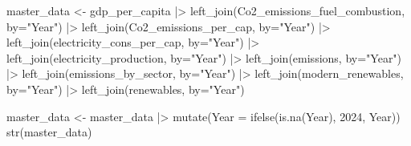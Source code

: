 \documentclass[
  letterpaper,
  DIV=11,
  numbers=noendperiod]{scrartcl}
\newenvironment{Shaded}{\begin{snugshade}}{\end{snugshade}}
\newcommand{\AttributeTok}[1]{\textcolor[rgb]{0.40,0.45,0.13}{#1}}
\newcommand{\DecValTok}[1]{\textcolor[rgb]{0.68,0.00,0.00}{#1}}
\newcommand{\FunctionTok}[1]{\textcolor[rgb]{0.28,0.35,0.67}{#1}}
\newcommand{\NormalTok}[1]{\textcolor[rgb]{0.00,0.23,0.31}{#1}}
\newcommand{\OtherTok}[1]{\textcolor[rgb]{0.00,0.23,0.31}{#1}}
\newcommand{\SpecialCharTok}[1]{\textcolor[rgb]{0.37,0.37,0.37}{#1}}
\newcommand{\StringTok}[1]{\textcolor[rgb]{0.13,0.47,0.30}{#1}}
\begin{document}
\begin{Shaded}
\begin{Highlighting}[]
\NormalTok{master\_data }\OtherTok{\textless{}{-}}\NormalTok{ gdp\_per\_capita }\SpecialCharTok{|\textgreater{}}
  \FunctionTok{left\_join}\NormalTok{(Co2\_emissions\_fuel\_combustion, }\AttributeTok{by=}\StringTok{"Year"}\NormalTok{) }\SpecialCharTok{|\textgreater{}}
  \FunctionTok{left\_join}\NormalTok{(Co2\_emissions\_per\_cap, }\AttributeTok{by=}\StringTok{"Year"}\NormalTok{) }\SpecialCharTok{|\textgreater{}}
  \FunctionTok{left\_join}\NormalTok{(electricity\_cons\_per\_cap, }\AttributeTok{by=}\StringTok{"Year"}\NormalTok{) }\SpecialCharTok{|\textgreater{}}
  \FunctionTok{left\_join}\NormalTok{(electricity\_production, }\AttributeTok{by=}\StringTok{"Year"}\NormalTok{) }\SpecialCharTok{|\textgreater{}}
  \FunctionTok{left\_join}\NormalTok{(emissions, }\AttributeTok{by=}\StringTok{"Year"}\NormalTok{) }\SpecialCharTok{|\textgreater{}}
  \FunctionTok{left\_join}\NormalTok{(emissions\_by\_sector, }\AttributeTok{by=}\StringTok{"Year"}\NormalTok{) }\SpecialCharTok{|\textgreater{}}
  \FunctionTok{left\_join}\NormalTok{(modern\_renewables, }\AttributeTok{by=}\StringTok{"Year"}\NormalTok{) }\SpecialCharTok{|\textgreater{}}
  \FunctionTok{left\_join}\NormalTok{(renewables, }\AttributeTok{by=}\StringTok{"Year"}\NormalTok{) }

\NormalTok{master\_data }\OtherTok{\textless{}{-}}\NormalTok{ master\_data }\SpecialCharTok{|\textgreater{}} \FunctionTok{mutate}\NormalTok{(}\AttributeTok{Year =} \FunctionTok{ifelse}\NormalTok{(}\FunctionTok{is.na}\NormalTok{(Year), }\DecValTok{2024}\NormalTok{, Year))}
\FunctionTok{str}\NormalTok{(master\_data)}
\end{Highlighting}
\end{Shaded}
\end{document}
